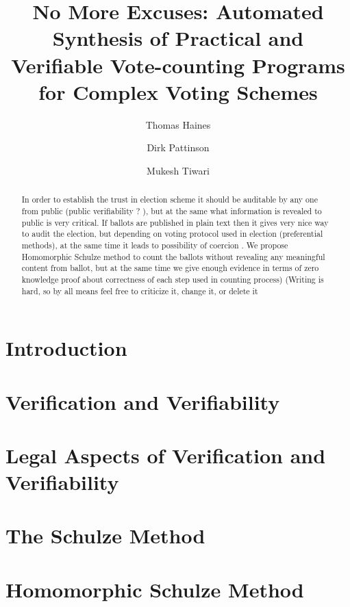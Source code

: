 \documentclass{llncs}
\begin{document}
\title{No More Excuses: Automated Synthesis of Practical and
Verifiable Vote-counting Programs for Complex Voting Schemes}

\author{Thomas Haines  \and
      Dirk Pattinson \and Mukesh Tiwari }
\maketitle

\begin{abstract}

In order to establish the trust in election scheme it should be auditable by any one from public (public verifiability ? ), but at the same what information is revealed to public is very critical. If ballots are published in plain text then it gives very nice way to audit the election, but depending on voting protocol used in election (preferential methods),  at the same time it leads to  possibility of coercion . We propose Homomorphic Schulze method to count the ballots without revealing any meaningful content from ballot, but at the same time we give enough evidence in terms of zero knowledge proof about correctness of each step used in counting process) (Writing is  hard, so by all means feel free to criticize it, change it, or delete it 
\end{abstract}


\section{Introduction}


\section{Verification and Verifiability} \label{sec:verif}


\section{Legal Aspects of Verification and Verifiability}






\section{The Schulze Method} \label{sec:schulze}

\section{Homomorphic Schulze Method} \label{sec:schulze}
\end{document}
